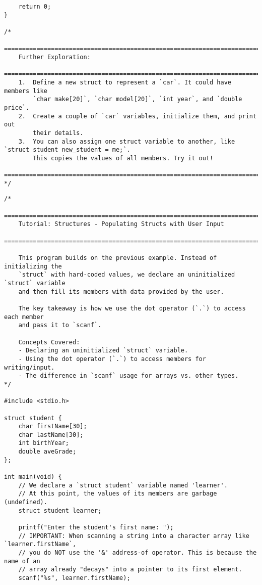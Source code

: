 \documentclass[11pt]{book}
\begin{document}
\begin{verbatim}
    return 0;
}

/*
    ================================================================================
    Further Exploration:
    ================================================================================
    1.  Define a new struct to represent a `car`. It could have members like
        `char make[20]`, `char model[20]`, `int year`, and `double price`.
    2.  Create a couple of `car` variables, initialize them, and print out
        their details.
    3.  You can also assign one struct variable to another, like `struct student new_student = me;`.
        This copies the values of all members. Try it out!
    ================================================================================
*/

\end{verbatim}
\clearpage
\begin{verbatim}
/*
    ================================================================================
    Tutorial: Structures - Populating Structs with User Input
    ================================================================================

    This program builds on the previous example. Instead of initializing the
    `struct` with hard-coded values, we declare an uninitialized `struct` variable
    and then fill its members with data provided by the user.

    The key takeaway is how we use the dot operator (`.`) to access each member
    and pass it to `scanf`.

    Concepts Covered:
    - Declaring an uninitialized `struct` variable.
    - Using the dot operator (`.`) to access members for writing/input.
    - The difference in `scanf` usage for arrays vs. other types.
*/

#include <stdio.h>

struct student {
    char firstName[30];
    char lastName[30];
    int birthYear;
    double aveGrade;
};

int main(void) {
    // We declare a `struct student` variable named 'learner'.
    // At this point, the values of its members are garbage (undefined).
    struct student learner;

    printf("Enter the student's first name: ");
    // IMPORTANT: When scanning a string into a character array like `learner.firstName`,
    // you do NOT use the '&' address-of operator. This is because the name of an
    // array already "decays" into a pointer to its first element.
    scanf("%s", learner.firstName);


\end{verbatim}
\end{document}
